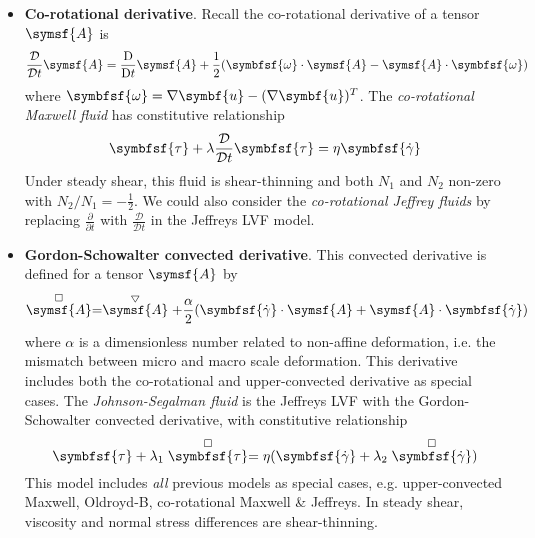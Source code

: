 \documentclass{jknotes}
\begin{document}
\begin{eg}
	\hspace{3in}
	\begin{itemize}
		\item \textbf{Co-rotational derivative}.
			Recall the co-rotational derivative of a tensor $\symsf{A}$ is
			\begin{equation}
				\frac{\mathcal{D}}{\mathcal{D} t} \symsf{A} =
				\frac{\diffD}{\diffD t} \symsf{A} +
				\frac{1}{2}(\symbfsf{\omega}\cdot\symsf{A} -
				\symsf{A}\cdot\symbfsf{\omega})
			\end{equation}
			where $\symbfsf{\omega} = \nabla \symbf{u} - (\nabla
			\symbf{u})^T$. The \emph{co-rotational Maxwell fluid} has constitutive
			relationship
			\begin{equation}
				\symbfsf{\tau} + \lambda \frac{\mathcal{D}}{\mathcal{D}t}
				\symbfsf{\tau} = \eta \symbfsf{\srate}
			\end{equation}
			Under steady shear, this fluid is shear-thinning and both $N_1$
			and $N_2$ non-zero with $N_2/N_1 = -\frac{1}{2}$. We could also
			consider the \emph{co-rotational Jeffrey fluids} by replacing
			$\frac{\partial}{\partial t}$ with $\frac{\mathcal{D}}{\mathcal{D}
			t}$ in the Jeffreys LVF model.
		\item \textbf{Gordon-Schowalter convected derivative}. This convected
			derivative is defined for a tensor $\symsf{A}$ by
			\begin{equation}
				\stackrel{\square}{\symsf{A}} =
				\stackrel{\bigtriangledown}{\symsf{A}} + \frac{\alpha}{2}
				(\symbfsf{\srate}\cdot\symsf{A} +
				\symsf{A}\cdot\symbfsf{\srate})
			\end{equation}
			where $\alpha$ is a dimensionless number related to non-affine
			deformation, i.e. the mismatch between micro and macro scale
			deformation. This derivative includes both the co-rotational and
			upper-convected derivative as special cases. The
			\emph{Johnson-Segalman fluid} is the Jeffreys LVF with the
			Gordon-Schowalter convected derivative, with constitutive
			relationship
			\begin{equation}
				\symbfsf{\tau} + \lambda_1 \stackrel{\square}{\symbfsf{\tau}} =
				\eta (\symbfsf{\srate} + \lambda_2
				\stackrel{\square}{\symbfsf{\srate}})
			\end{equation}
			This model includes \emph{all} previous models as special cases,
			e.g. upper-convected Maxwell, Oldroyd-B, co-rotational Maxwell \&
			Jeffreys. In steady shear, viscosity and normal stress differences
			are shear-thinning.
	\end{itemize}
\end{eg}
\end{document}

